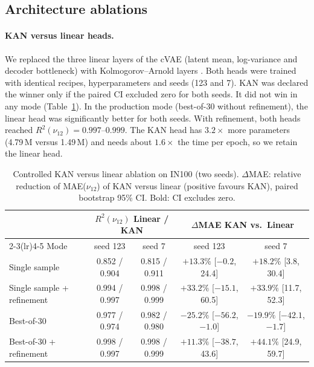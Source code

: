 \documentclass[a4paper,11pt]{article}
\newcommand{\nuot}{\nu_{12}}
\newcommand{\RR}{R^2}
\begin{document}
\subsection{Architecture ablations}

\paragraph{KAN versus linear heads.}
We replaced the three linear layers of the cVAE (latent mean, log-variance
and decoder bottleneck) with Kolmogorov--Arnold layers \citep{liu2024kan}.
Both heads were trained with identical recipes, hyperparameters and seeds
(123 and 7). KAN was declared the winner only if the paired CI excluded zero
for both seeds. It did not win in any mode (Table~\ref{tab:kan}). In the
production mode (best-of-30 without refinement), the linear head was
significantly better for both seeds. With refinement, both heads reached
$\RR(\nuot)=0.997$--$0.999$. The KAN head has $3.2\times$ more parameters
(4.79\,M versus 1.49\,M) and needs about $1.6\times$ the time per epoch, so
we retain the linear head.

\begin{table}[t]
\centering
\caption{Controlled KAN versus linear ablation on IN100 (two seeds).
$\Delta$MAE: relative reduction of MAE($\nuot$) of KAN versus linear
(positive favours KAN), paired bootstrap 95\% CI. Bold: CI excludes zero.}
\label{tab:kan}
\small
\setlength{\tabcolsep}{4pt}
\begin{tabular}{lcccc}
\toprule
 & \multicolumn{2}{c}{$\RR(\nuot)$ Linear / KAN} & \multicolumn{2}{c}{$\Delta$MAE KAN vs.\ Linear}\\
\cmidrule(lr){2-3}\cmidrule(lr){4-5}
Mode & seed 123 & seed 7 & seed 123 & seed 7\\
\midrule
Single sample              & 0.852 / 0.904 & 0.815 / 0.911 & $+13.3\%$ [$-0.2$, 24.4] & $\mathbf{+18.2\%}$ [3.8, 30.4]\\
Single sample + refinement & 0.994 / 0.997 & 0.998 / 0.999 & $+33.2\%$ [$-15.1$, 60.5] & $\mathbf{+33.9\%}$ [11.7, 52.3]\\
Best-of-30                 & 0.977 / 0.974 & 0.982 / 0.980 & $\mathbf{-25.2\%}$ [$-56.2$, $-1.0$] & $\mathbf{-19.9\%}$ [$-42.1$, $-1.7$]\\
Best-of-30 + refinement    & 0.998 / 0.997 & 0.998 / 0.999 & $+11.3\%$ [$-38.7$, 43.6] & $\mathbf{+44.1\%}$ [24.9, 59.7]\\
\bottomrule
\end{tabular}
\end{table}
\end{document}

